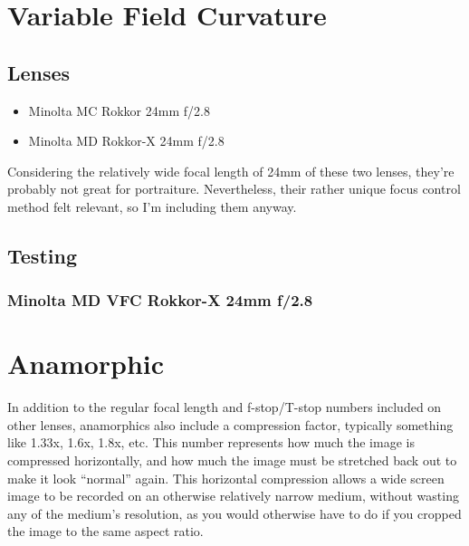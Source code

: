 \documentclass{article}
\begin{document}
\section{Variable Field Curvature}

\subsection{Lenses}

\begin{itemize}
	\item Minolta MC \textbf{} Rokkor 24mm f/2.8
	\item Minolta MD \textbf{} Rokkor-X 24mm f/2.8
\end{itemize}

Considering the relatively wide focal length of 24mm of these two lenses,
they're probably not great for portraiture.
Nevertheless, their rather unique focus control method felt relevant,
so I'm including them anyway.

\subsection{Testing}

\subsubsection{Minolta MD VFC Rokkor-X 24mm f/2.8}

\section{Anamorphic}


In addition to the regular focal length and f-stop/T-stop numbers included
on other lenses, anamorphics also include a compression factor,
typically something like 1.33x, 1.6x, 1.8x, etc.
This number represents how much the image is compressed horizontally,
and how much the image must be stretched back out to make it look ``normal''
again.
This horizontal compression allows a wide screen image to be recorded on an
otherwise relatively narrow medium, without wasting any of the medium's
resolution, as you would otherwise have to do if you cropped the image to the
same aspect ratio.
\end{document}
